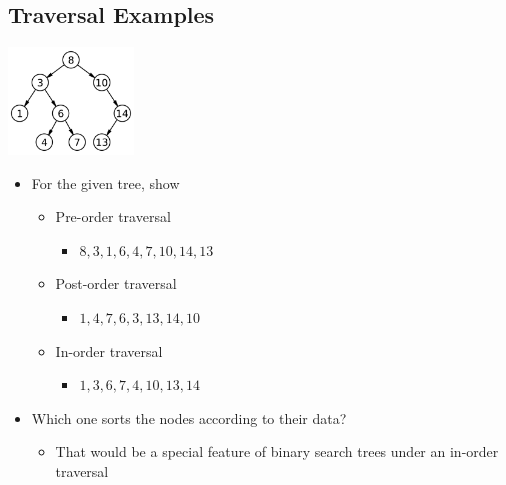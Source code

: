 \documentclass[10pt]{article}
\begin{document}
\subsection*{Traversal Examples}
\begin{center}
    \includegraphics[width=0.25\textwidth]{images/4.png}
\end{center}
\begin{itemize}
    \item For the given tree, show
    \begin{itemize}
        \item Pre-order traversal
        \begin{itemize}
            \item $8,3,1,6,4,7,10,14,13$
        \end{itemize}
        \item Post-order traversal
        \begin{itemize}
            \item $1,4,7,6,3,13,14,10$
        \end{itemize}
        \item In-order traversal
        \begin{itemize}
            \item $1,3,6,7,4,10,13,14$
        \end{itemize}
    \end{itemize}
    \item Which one sorts the nodes according to their data?
    \begin{itemize}
        \item That would be a special feature of binary search trees under an in-order traversal
    \end{itemize}
\end{itemize}
\end{document}
